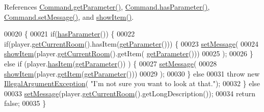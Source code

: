 References \hyperlink{Command_8java_source_l00025}{Command.\-get\-Parameter()}, \hyperlink{Command_8java_source_l00041}{Command.\-has\-Parameter()}, \hyperlink{Command_8java_source_l00049}{Command.\-set\-Message()}, and \hyperlink{LookCommand_8java_source_l00042}{show\-Item()}.


\begin{DoxyCode}
00020                                                                           \{
00021         \textcolor{keywordflow}{if}(\hyperlink{classCommand_a9b042558156d6749566e0fd9d48d3bfe}{hasParameter}()) \{
00022             \textcolor{keywordflow}{if}(player.\hyperlink{classPlayer_a3a3107df50fc4e35e8c0f46c3f776ce6}{getCurrentRoom}().hasItem(\hyperlink{classCommand_a1ced3739d546770ba1389e6ce228255e}{getParameter}())) \{
00023                 \hyperlink{classCommand_a715709d8f0ab65879d79ad1725c96f17}{setMessage}(
00024                         \hyperlink{classLookCommand_ad96c354dee73acf189f99e988a796bc7}{showItem}(player.\hyperlink{classPlayer_a3a3107df50fc4e35e8c0f46c3f776ce6}{getCurrentRoom}().getItem(
      \hyperlink{classCommand_a1ced3739d546770ba1389e6ce228255e}{getParameter}()))
00025                         );
00026             \} \textcolor{keywordflow}{else} \textcolor{keywordflow}{if} (player.\hyperlink{classPlayer_a90cb3f05b491eaed668fe54b9258b755}{hasItem}(\hyperlink{classCommand_a1ced3739d546770ba1389e6ce228255e}{getParameter}()) ) \{
00027                 \hyperlink{classCommand_a715709d8f0ab65879d79ad1725c96f17}{setMessage}(
00028                         \hyperlink{classLookCommand_ad96c354dee73acf189f99e988a796bc7}{showItem}(player.\hyperlink{classPlayer_a8c183303976b4ea5d0c10fdbff14e4a1}{getItem}(\hyperlink{classCommand_a1ced3739d546770ba1389e6ce228255e}{getParameter}()))
00029                         );
00030             \} \textcolor{keywordflow}{else}
00031                 \textcolor{keywordflow}{throw} \textcolor{keyword}{new} \hyperlink{classIllegalArgumentException}{IllegalArgumentException}( \textcolor{stringliteral}{"I'm not sure you want to look
       at that."});
00032         \} \textcolor{keywordflow}{else}
00033             \hyperlink{classCommand_a715709d8f0ab65879d79ad1725c96f17}{setMessage}(player.\hyperlink{classPlayer_a3a3107df50fc4e35e8c0f46c3f776ce6}{getCurrentRoom}().getLongDescription());
00034         \textcolor{keywordflow}{return} \textcolor{keyword}{false};
00035     \}
\end{DoxyCode}


